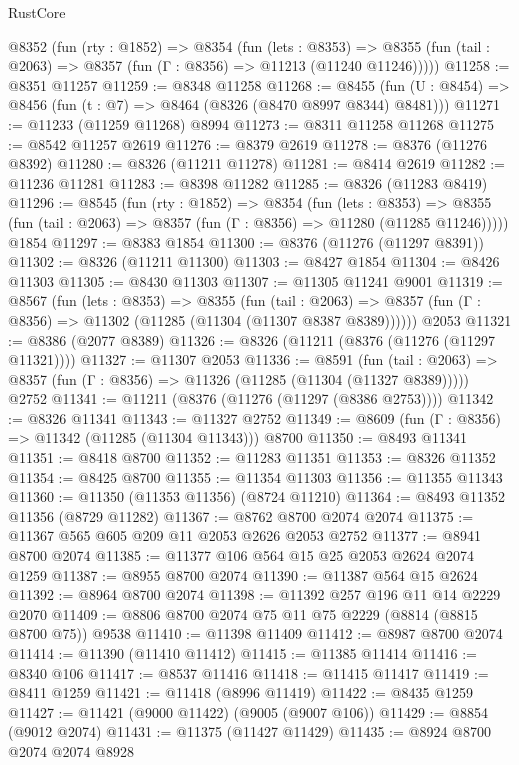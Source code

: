 \begin{lexlean}{RustCore}
\begin{coremodule}
  @8352
    (fun (rty : @1852) =>
    @8354
      (fun (lets : @8353) =>
      @8355 (fun (tail : @2063) => @8357 (fun (Γ : @8356) => @11213 (@11240 @11246)))))
@11258 := @8351 @11257
@11259 := @8348 @11258
@11268 := @8455 (fun (U : @8454) => @8456 (fun (t : @7) => @8464 (@8326 (@8470 @8997 @8344) @8481)))
@11271 := @11233 (@11259 @11268) @8994
@11273 := @8311 @11258 @11268
@11275 := @8542 @11257 @2619
@11276 := @8379 @2619
@11278 := @8376 (@11276 @8392)
@11280 := @8326 (@11211 @11278)
@11281 := @8414 @2619
@11282 := @11236 @11281
@11283 := @8398 @11282
@11285 := @8326 (@11283 @8419)
@11296 := @8545
    (fun (rty : @1852) =>
    @8354
      (fun (lets : @8353) =>
      @8355 (fun (tail : @2063) => @8357 (fun (Γ : @8356) => @11280 (@11285 @11246)))))
    @1854
@11297 := @8383 @1854
@11300 := @8376 (@11276 (@11297 @8391))
@11302 := @8326 (@11211 @11300)
@11303 := @8427 @1854
@11304 := @8426 @11303
@11305 := @8430 @11303
@11307 := @11305 @11241 @9001
@11319 := @8567
    (fun (lets : @8353) =>
    @8355
      (fun (tail : @2063) =>
      @8357 (fun (Γ : @8356) => @11302 (@11285 (@11304 (@11307 @8387 @8389))))))
    @2053
@11321 := @8386 (@2077 @8389)
@11326 := @8326 (@11211 (@8376 (@11276 (@11297 @11321))))
@11327 := @11307 @2053
@11336 := @8591
    (fun (tail : @2063) => @8357 (fun (Γ : @8356) => @11326 (@11285 (@11304 (@11327 @8389)))))
    @2752
@11341 := @11211 (@8376 (@11276 (@11297 (@8386 @2753))))
@11342 := @8326 @11341
@11343 := @11327 @2752
@11349 := @8609 (fun (Γ : @8356) => @11342 (@11285 (@11304 @11343))) @8700
@11350 := @8493 @11341
@11351 := @8418 @8700
@11352 := @11283 @11351
@11353 := @8326 @11352
@11354 := @8425 @8700
@11355 := @11354 @11303
@11356 := @11355 @11343
@11360 := @11350 (@11353 @11356) (@8724 @11210)
@11364 := @8493 @11352 @11356 (@8729 @11282)
@11367 := @8762 @8700 @2074 @2074
@11375 := @11367 @565 @605 @209 @11 @2053 @2626 @2053 @2752
@11377 := @8941 @8700 @2074
@11385 := @11377 @106 @564 @15 @25 @2053 @2624 @2074 @1259
@11387 := @8955 @8700 @2074
@11390 := @11387 @564 @15 @2624
@11392 := @8964 @8700 @2074
@11398 := @11392 @257 @196 @11 @14 @2229 @2070
@11409 := @8806 @8700 @2074 @75 @11 @75 @2229 (@8814 (@8815 @8700 @75)) @9538
@11410 := @11398 @11409
@11412 := @8987 @8700 @2074
@11414 := @11390 (@11410 @11412)
@11415 := @11385 @11414
@11416 := @8340 @106
@11417 := @8537 @11416
@11418 := @11415 @11417
@11419 := @8411 @1259
@11421 := @11418 (@8996 @11419)
@11422 := @8435 @1259
@11427 := @11421 (@9000 @11422) (@9005 (@9007 @106))
@11429 := @8854 (@9012 @2074)
@11431 := @11375 (@11427 @11429)
@11435 := @8924 @8700 @2074 @2074 @8928

\end{coremodule}
\end{lexlean}
